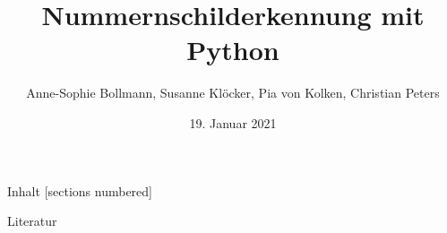 \documentclass[10pt]{beamer}
\title{Nummernschilderkennung mit Python}
\date{19. Januar 2021}
\author{Anne-Sophie Bollmann, Susanne Kl\"ocker, Pia von Kolken, Christian Peters}
\begin{document}
\maketitle

\begin{frame}{Inhalt}
  [sections numbered]
  \tableofcontents
\end{frame}









\appendix

\begin{frame}[allowframebreaks]{Literatur}

  
  

\end{frame}
\end{document}
